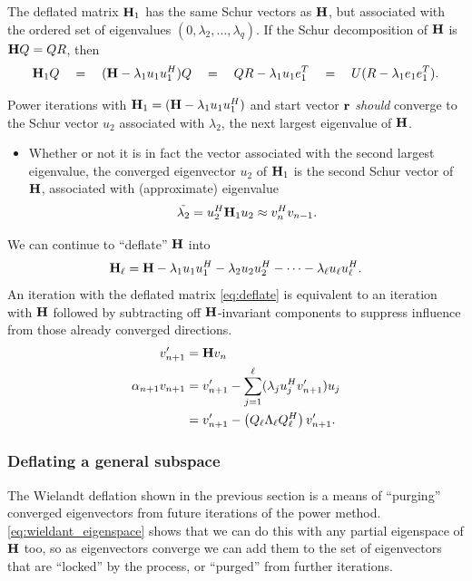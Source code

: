 The deflated matrix $\textbf{\textup{H}}_1$ has the same Schur vectors as $\textbf{\textup{H}}$, but associated with the ordered set of eigenvalues 
$(0, \lambda_2, \ldots,\lambda_q)$.
If the Schur decomposition of $\textbf{\textup{H}}$ is $\textbf{\textup{H}} Q = Q R$, then 
\[
\textbf{\textup{H}}_1 Q \quad =\quad  (\textbf{\textup{H}} -\lambda_1 u_1 u_1^H)Q \quad=\quad QR - \lambda_1 u_1 e_1^T \quad=\quad U(R-\lambda_1 e_1 e_1^T).
\] 

Power iterations with $\textbf{\textup{H}}_1= (\textbf{\textup{H}}-\lambda_1 u_1 u_1^H)$ and start vector $\textbf{\textup{r}}$ \emph{should} converge to the Schur vector $u_2$ associated with $\lambda_2$, the next largest eigenvalue of $\textbf{\textup{H}}$.  
\begin{itemize}
\item Whether or not it is in fact the vector associated with the second largest eigenvalue, the converged eigenvector $u_2$ of  $\textbf{\textup{H}}_1$ is the second Schur vector of $\textbf{\textup{H}}$, associated with (approximate) eigenvalue 
\[
\tilde{\lambda_2} = u_2^H \textbf{\textup{H}}_1 u_2 \approx v_{n}^H v_{n-1}.
\]  
\end{itemize}

We can continue to ``deflate'' $\textbf{\textup{H}}$ into 
\begin{equation}
\textbf{\textup{H}}_\ell = \textbf{\textup{H}} -  \lambda_1 u_1 u_1^H -  \lambda_2 u_2 u_2^H - \cdots -  \lambda_\ell u_\ell u_\ell^H.
\label{eq:deflate}
\end{equation}
An iteration with the deflated matrix \eqref{eq:deflate} is equivalent to an iteration with $\textbf{\textup{H}}$ followed by subtracting off $\textbf{\textup{H}}$-invariant components to suppress influence from those already converged directions.  
\begin{align}
v^\prime_{n+1} &= \textbf{\textup{H}} v_n \nonumber \\
\alpha_{n+1} v_{n+1} &= v^\prime_{n+1} - \sum_{j=1}^\ell (\lambda_j u_j^H v^\prime_{n+1}) u_j \nonumber \\
&= v^\prime_{n+1}  - \left( Q_\ell \Lambda_\ell Q_\ell^H \right) v^\prime_{n+1}.
\label{eq:wieldant_eigenspace}
\end{align}


\subsubsection{Deflating a general subspace}
The Wielandt deflation shown in the previous section is a means of ``purging'' converged eigenvectors from future iterations of the power method.  \eqref{eq:wieldant_eigenspace} shows that we can do this with any partial eigenspace of $\textbf{\textup{H}}$ too, so as eigenvectors converge we can add them to the set of eigenvectors that are ``locked'' by the process, or ``purged'' from further iterations.      

